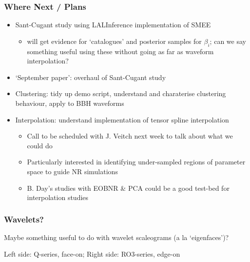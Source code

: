 \documentclass{beamer}
\begin{document}
\begin{frame}
    \frametitle{Where Next / Plans}
    \small
    \begin{itemize}
        \item Sant-Cugant study using LALInference implementation of SMEE
            \begin{itemize}
                \item will get evidence for `catalogues' and posterior samples
                    for $\beta_i$; can we say something useful using these
                    without going as far as waveform interpolation?
            \end{itemize}
        \item `September paper':  overhaul of Sant-Cugant study 
        \item Clustering: tidy up demo script, understand and charaterise
            clustering behaviour, apply to BBH waveforms
        \item Interpolation: understand implementation of tensor spline interpolation
            \begin{itemize}
                \item Call to be scheduled with J. Veitch next week to talk
                    about what we could do
                \item Particularly interested in identifying under-sampled
                    regions of parameter space to guide NR simulations
                \item B. Day's studies with EOBNR \& PCA could be a good
                    test-bed for interpolation studies
            \end{itemize}
    \end{itemize}
\end{frame}

\begin{frame}
    \frametitle{Wavelets?}
    Maybe something useful to do with wavelet scaleograms (a la `eigenfaces')?

    Left side: Q-series, face-on; Right side: RO3-series, edge-on
    \begin{figure}
        \center
    \end{figure}

\end{frame}
\end{document}
